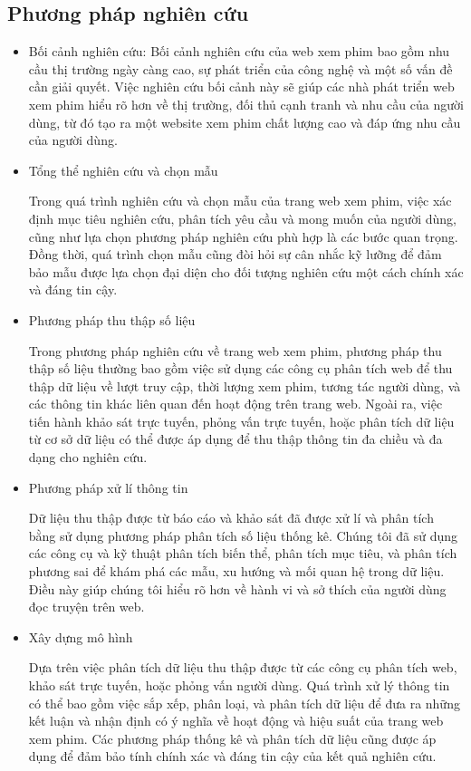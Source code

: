 \subsection{Phương pháp nghiên cứu}
\begin{itemize}
    \item Bối cảnh nghiên cứu:
Bối cảnh nghiên cứu của web xem phim bao gồm nhu cầu thị trường ngày càng cao, sự phát triển của công nghệ và một số vấn đề cần giải quyết. Việc nghiên cứu bối cảnh này sẽ giúp các nhà phát triển web xem phim hiểu rõ hơn về thị trường, đối thủ cạnh tranh và nhu cầu của người dùng, từ đó tạo ra một website xem phim chất lượng cao và đáp ứng nhu cầu của người dùng.
    \item Tổng thể nghiên cứu và chọn mẫu
    
Trong quá trình nghiên cứu và chọn mẫu của trang web xem phim, việc xác định mục tiêu nghiên cứu, phân tích yêu cầu và mong muốn của người dùng, cũng như lựa chọn phương pháp nghiên cứu phù hợp là các bước quan trọng. Đồng thời, quá trình chọn mẫu cũng đòi hỏi sự cân nhắc kỹ lưỡng để đảm bảo mẫu được lựa chọn đại diện cho đối tượng nghiên cứu một cách chính xác và đáng tin cậy.
    \item Phương pháp thu thập số liệu

Trong phương pháp nghiên cứu về trang web xem phim, phương pháp thu thập số liệu thường bao gồm việc sử dụng các công cụ phân tích web để thu thập dữ liệu về lượt truy cập, thời lượng xem phim, tương tác người dùng, và các thông tin khác liên quan đến hoạt động trên trang web. Ngoài ra, việc tiến hành khảo sát trực tuyến, phỏng vấn trực tuyến, hoặc phân tích dữ liệu từ cơ sở dữ liệu có thể được áp dụng để thu thập thông tin đa chiều và đa dạng cho nghiên cứu.
    \item Phương pháp xử lí thông tin

Dữ liệu thu thập được từ báo cáo và khảo sát đã được xử lí và phân tích bằng sử dụng phương pháp phân tích số liệu thống kê. Chúng tôi đã sử dụng các công cụ và kỹ thuật phân tích biến thể, phân tích mục tiêu, và phân tích phương sai để khám phá các mẫu, xu hướng và mối quan hệ trong dữ liệu. Điều này giúp chúng tôi hiểu rõ hơn về hành vi và sở thích của người dùng đọc truyện trên web.
    \item Xây dựng mô hình

Dựa trên việc phân tích dữ liệu thu thập được từ các công cụ phân tích web, khảo sát trực tuyến, hoặc phỏng vấn người dùng. Quá trình xử lý thông tin có thể bao gồm việc sắp xếp, phân loại, và phân tích dữ liệu để đưa ra những kết luận và nhận định có ý nghĩa về hoạt động và hiệu suất của trang web xem phim. Các phương pháp thống kê và phân tích dữ liệu cũng được áp dụng để đảm bảo tính chính xác và đáng tin cậy của kết quả nghiên cứu.
\end{itemize}

